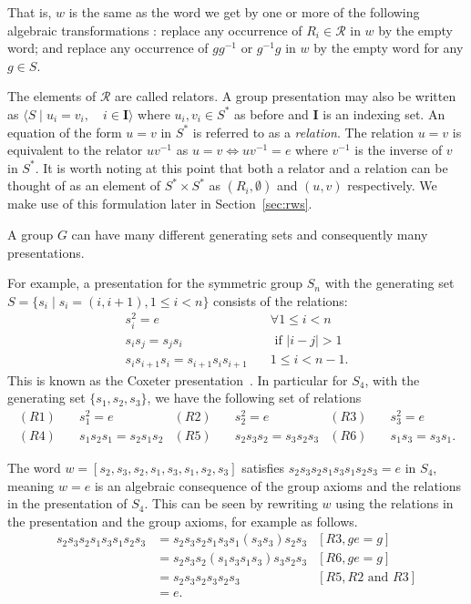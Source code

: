 \documentclass[utf8]{Frontiers_LaTex_Templates/frontiersFPHY} %
\newcommand{\id}{e}
\numberwithin{equation}{section}
\begin{document}
That is, $w$ is the same as the word we get by one or more of the following algebraic transformations : replace any occurrence of $R_i \in \mathcal{R}$ in $w$ by the empty word; and replace any occurrence of $gg^{-1}$ or $g^{-1}g$ in $w$ by the empty word for any $g \in S$.

The elements of $\mathcal{R}$ are called relators. A group presentation may also be written as
$\langle S \mid u_i = v_i, \quad i \in \mathbf{I}  \rangle$ where $u_i, v_i \in S^*$ as before and $\mathbf{I}$ is an indexing set. An equation of the form $u = v$ in $S^*$ is referred to as a \emph{relation}. The relation $u = v$ is equivalent to the relator $u v^{-1}$ as $u = v \iff u v^{-1} = \id$ where $v^{-1}$ is the inverse of $v$ in $S^*$.  It is worth noting at this point that both a relator and a relation can be thought of as an element of $S^* \times S^*$ as $(R_i, \emptyset)$ and $(u, v)$ respectively. We make use of this formulation later in Section~\ref{sec:rws}.

A group $G$ can have many different generating sets and consequently many presentations.  


For example, a presentation for the symmetric group $S_n$ with the generating set $S=\{s_i \mid s_i = (i, i+1), 1 \leq i < n\}$ consists of the relations:
\begin{align*}
s_i^2 = \id & \quad \forall 1 \leq i < n \\
s_i s_j = s_j s_i & \quad \mbox{ if } |i-j| > 1 \\
s_i s_{i+1} s_i = s_{i+1} s_i s_{i+1} & \quad 1 \leq i < n-1.
\end{align*}
This is known as the Coxeter presentation~\citep{humphreys1992reflection}. 
In particular for $S_4$, with the generating set $\{s_1, s_2, s_3\}$, we have the following set of relations
\begin{align*}
(R1) & \quad s_1^2 = \id & (R2) & \quad s_2^2 = \id & (R3) & \quad s_3^2 = \id\\
(R4) & \quad s_1 s_2 s_1 = s_2 s_1 s_2  & (R5) & \quad s_2 s_3 s_2 = s_3 s_2 s_3 
 & (R6) & \quad s_1 s_3 = s_3 s_1. 
\end{align*}

The word $w = [s_2, s_3, s_2, s_1, s_3, s_1, s_2, s_3]$ satisfies  
$s_2 s_3 s_2 s_1 s_3 s_1 s_2 s_3 
=
\id$ in $S_4$, meaning $w 
=
\id$ is an algebraic consequence of the group axioms and the relations in the presentation of $S_4$. This can be seen by rewriting $w$ using the relations in the presentation and the group axioms, for example as follows.
% 
\begin{align*}
s_2 s_3 s_2 s_1 s_3 s_1 s_2 s_3 &= s_2 s_3 s_2 s_1 s_3 s_1 (s_3 s_3) s_2 s_3 & [R3, g\id=g] \\
&= s_2 s_3 s_2 (s_1 s_3 s_1 s_3) s_3 s_2 s_3 & [R6, g\id=g]\\
&= s_2 s_3 s_2 s_3 s_2 s_3 & [R5, R2 \text{ and }R3]\\
&= \id.
\end{align*}
\end{document}

